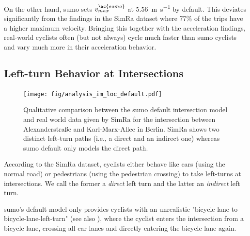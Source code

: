 On the other hand, \ac{sumo} sets $v_{max}^{\ac{sumo}}$ at \SI{5.56}{\metre\per\s} by default.
This deviates significantly from the findings in the SimRa dataset where \num{77}\% of the trips have a higher maximum velocity.
Bringing this together with the acceleration findings, real-world cyclists often (but not always) cycle much faster than \ac{sumo} cyclists and vary much more in their acceleration behavior.

\subsection{Left-turn Behavior at Intersections}
\label{subsec:left-turn_behavior_at_intersections_preprocessing}
\begin{figure}
    \centering
    \texttt{[image: fig/analysis\_im\_loc\_default.pdf]}
    \caption{%
        Qualitative comparison between the \ac{sumo} default intersection model and real world data given by SimRa for the intersection between Alexanderstraße and Karl-Marx-Allee in Berlin.
        SimRa shows two distinct left-turn paths (i.e., a direct and an indirect one) whereas \ac{sumo} default only models the direct path.
    }%
    \label{fig:analysis_im_traj_default}
\end{figure}

According to the SimRa dataset, cyclists either behave like cars (using the normal road) or pedestrians (using the pedestrian crossing) to take left-turns at intersections.
We call the former a \textit{direct} left turn and the latter an \textit{indirect} left turn.

\ac{sumo}'s default model only provides cyclists with an unrealistic "bicycle-lane-to-bicycle-lane-left-turn" (see also ), where the cyclist enters the intersection from a bicycle lane, crossing all car lanes and directly entering the bicycle lane again.

